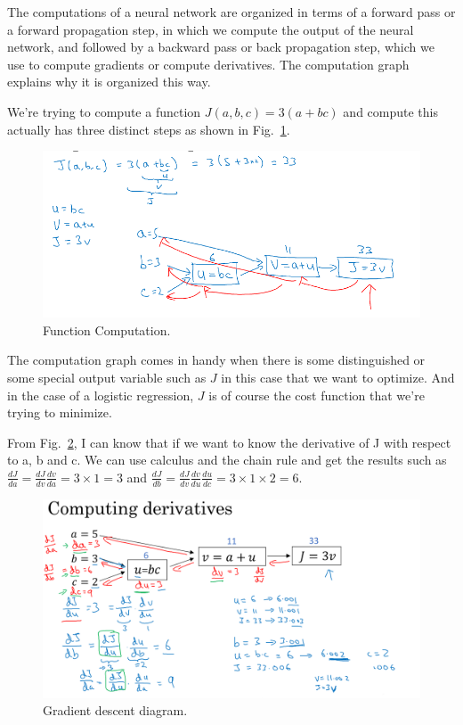 \documentclass[a4paper]{article}
\begin{document}
The computations of a neural network are organized in terms of a forward pass or a forward propagation step, in which we compute the output of the neural network, and followed by a backward pass or back propagation step, which we use to compute gradients or compute derivatives. The computation graph explains why it is organized this way.

We're trying to compute a function $J(a,b,c)=3(a+bc)$ and compute this actually has three distinct steps as shown in Fig.~\ref{p6}.
\begin{figure}
	\begin{center}
		\includegraphics[scale=0.4]{figures/7.png}
	\end{center}
	\caption{Function Computation.}
	\label{p6}
\end{figure}

The computation graph comes in handy when there is some distinguished or some special output variable such as $J$ in this case that we want to optimize. And in the case of a logistic regression, $J$ is of course the cost function that we're trying to minimize.

From Fig.~\ref{p7}, I can know that if we want to know the derivative of J with respect to a, b and c. We can use calculus and the chain rule and get the results such as $\frac{dJ}{da}=\frac{dJ}{dv}\frac{dv}{da}=3\times 1=3$ and $\frac{dJ}{db}=\frac{dJ}{dv}\frac{dv}{du}\frac{du}{dc}=3\times 1\times 2=6$.
\begin{figure}
	\begin{center}
		\includegraphics[scale=0.3]{figures/8.png}
	\end{center}
	\caption{Gradient descent diagram.}
	\label{p7}
\end{figure}
\end{document}
